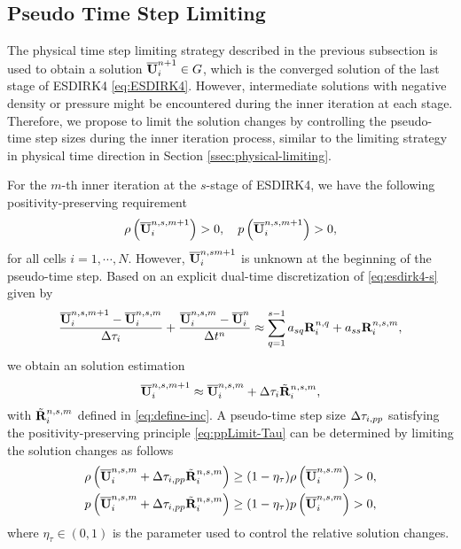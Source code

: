 \subsection{Pseudo Time Step Limiting}
\label{ssec:pseudo-limiting}

The physical time step limiting strategy described in the previous subsection is used to obtain a solution $\overline{\mathbf{U}}_i^{n+1} \in G$, which is the converged solution of the last stage of ESDIRK4 \eqref{eq:ESDIRK4}. However, intermediate solutions with negative density or pressure might be encountered during the inner iteration at each stage. Therefore, we propose to limit the solution changes by controlling the pseudo-time step sizes during the inner iteration process, similar to the limiting strategy in physical time direction in Section \ref{ssec:physical-limiting}. 

For the $m$-th inner iteration at the $s$-stage of ESDIRK4, we have the following positivity-preserving requirement
\begin{equation}
	\label{eq:ppLimit-Tau} 
		\rho\left(\overline{\mathbf{U}}_i^{n,s,m+1} \right)>0, \quad 
		p\left(\overline{\mathbf{U}}_i^{n,s,m+1}\right)>0,
\end{equation}
for all cells $i=1,\cdots,N$. However, $\overline{\mathbf{U}}^{n,sm+1}_i$ is unknown at the beginning of the pseudo-time step. Based on an explicit dual-time  discretization of \eqref{eq:esdirk4-s} given by
\begin{equation}
	\dfrac{\overline{\mathbf{U}}^{n,s,m+1}_i-\overline{\mathbf{U}}^{n,s,m}_i}{\mathrm\Delta \tau_i} + \dfrac{\overline{\mathbf{U}}^{n,s,m}_i - \overline{\mathbf{U}}^{n}_i}{\mathrm\Delta t^n} \approx \sum_{q=1}^{s-1} a_{sq} \mathbf{R}^{n,q}_i + a_{ss} \mathbf{R}_i^{n,s,m},
\end{equation}
we obtain an solution estimation
\begin{equation}
	\label{eq:estimation-dtau}
	\overline{\mathbf{U}}_i^{n,s,m+1} \approx  \overline{\mathbf{U}}_i^{n,s,m} + \mathrm\Delta \tau_i  \tilde{\mathbf{R}}_i^{n,s,m},
\end{equation}
with $ \tilde{\mathbf{R}}_i^{n,s,m}$ defined in \eqref{eq:define-inc}.
A pseudo-time step size $ \mathrm\Delta \tau_{i,pp}$ satisfying the positivity-preserving principle \eqref{eq:ppLimit-Tau} can be determined by limiting the solution changes as follows
\begin{equation}
	\label{eq:ppLimitDtau}
	\begin{aligned}
		\rho\left(\overline{\mathbf{U}}_i^{n,s,m} +  \mathrm\Delta \tau_{i,pp} \tilde{\mathbf{R}}_i^{n,s,m}\right)
		& \geq
		(1- \eta_\tau)
		\rho\left(\overline{\mathbf{U}}_i^{n,s.m}\right)>0, \\
		p\left(\overline{\mathbf{U}}_i^{n,s,m} + \mathrm\Delta  \tau_{i,pp} \tilde{\mathbf{R}}_i^{n,s,m}\right)
		& \geq
		(1- \eta_\tau)
		p\left(\overline{\mathbf{U}}_i^{n,s,m}\right)>0,
	\end{aligned}
\end{equation}
where $\eta_\tau\in(0,1)$ is the parameter used to control the relative solution changes.

